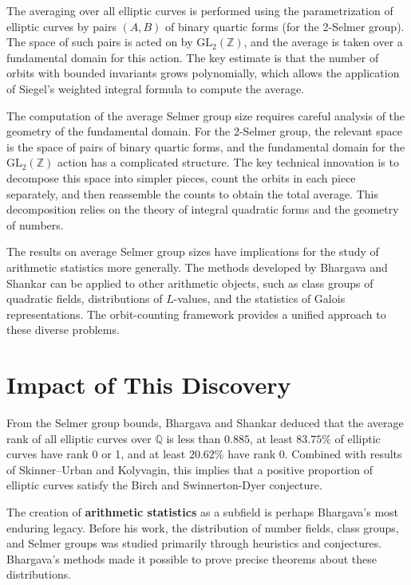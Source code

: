 The averaging over all elliptic curves is performed using the parametrization of elliptic curves by pairs $(A,B)$ of binary quartic forms (for the 2-Selmer group). The space of such pairs is acted on by $\mathrm{GL}_2(\mathbb{Z})$, and the average is taken over a fundamental domain for this action. The key estimate is that the number of orbits with bounded invariants grows polynomially, which allows the application of Siegel's weighted integral formula to compute the average.

The computation of the average Selmer group size requires careful analysis of the geometry of the fundamental domain. For the 2-Selmer group, the relevant space is the space of pairs of binary quartic forms, and the fundamental domain for the $\mathrm{GL}_2(\mathbb{Z})$ action has a complicated structure. The key technical innovation is to decompose this space into simpler pieces, count the orbits in each piece separately, and then reassemble the counts to obtain the total average. This decomposition relies on the theory of integral quadratic forms and the geometry of numbers.

The results on average Selmer group sizes have implications for the study of arithmetic statistics more generally. The methods developed by Bhargava and Shankar can be applied to other arithmetic objects, such as class groups of quadratic fields, distributions of $L$-values, and the statistics of Galois representations. The orbit-counting framework provides a unified approach to these diverse problems.

\section{Impact of This Discovery}

From the Selmer group bounds, Bhargava and Shankar deduced that the average rank of all elliptic curves over $\mathbb{Q}$ is less than $0.885$, at least $83.75\%$ of elliptic curves have rank 0 or 1, and at least $20.62\%$ have rank 0. Combined with results of Skinner--Urban and Kolyvagin, this implies that a positive proportion of elliptic curves satisfy the Birch and Swinnerton-Dyer conjecture.

The creation of \textbf{arithmetic statistics} as a subfield is perhaps Bhargava's most enduring legacy. Before his work, the distribution of number fields, class groups, and Selmer groups was studied primarily through heuristics and conjectures. Bhargava's methods made it possible to prove precise theorems about these distributions.

